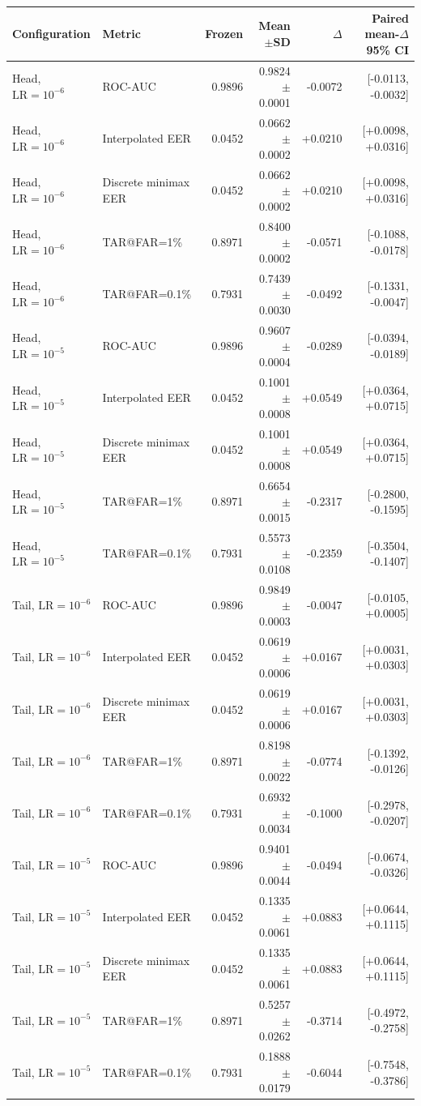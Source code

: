 \begin{tabular}{llrrrr}
\toprule
Configuration & Metric & Frozen & Mean$\pm$SD & $\Delta$ & Paired mean-$\Delta$ 95\% CI \\
\midrule
Head, $\mathrm{LR}=10^{-6}$ & ROC-AUC & 0.9896 & 0.9824$\pm$0.0001 & -0.0072 & [-0.0113, -0.0032] \\
Head, $\mathrm{LR}=10^{-6}$ & Interpolated EER & 0.0452 & 0.0662$\pm$0.0002 & +0.0210 & [+0.0098, +0.0316] \\
Head, $\mathrm{LR}=10^{-6}$ & Discrete minimax EER & 0.0452 & 0.0662$\pm$0.0002 & +0.0210 & [+0.0098, +0.0316] \\
Head, $\mathrm{LR}=10^{-6}$ & TAR@FAR=1\% & 0.8971 & 0.8400$\pm$0.0002 & -0.0571 & [-0.1088, -0.0178] \\
Head, $\mathrm{LR}=10^{-6}$ & TAR@FAR=0.1\% & 0.7931 & 0.7439$\pm$0.0030 & -0.0492 & [-0.1331, -0.0047] \\
Head, $\mathrm{LR}=10^{-5}$ & ROC-AUC & 0.9896 & 0.9607$\pm$0.0004 & -0.0289 & [-0.0394, -0.0189] \\
Head, $\mathrm{LR}=10^{-5}$ & Interpolated EER & 0.0452 & 0.1001$\pm$0.0008 & +0.0549 & [+0.0364, +0.0715] \\
Head, $\mathrm{LR}=10^{-5}$ & Discrete minimax EER & 0.0452 & 0.1001$\pm$0.0008 & +0.0549 & [+0.0364, +0.0715] \\
Head, $\mathrm{LR}=10^{-5}$ & TAR@FAR=1\% & 0.8971 & 0.6654$\pm$0.0015 & -0.2317 & [-0.2800, -0.1595] \\
Head, $\mathrm{LR}=10^{-5}$ & TAR@FAR=0.1\% & 0.7931 & 0.5573$\pm$0.0108 & -0.2359 & [-0.3504, -0.1407] \\
Tail, $\mathrm{LR}=10^{-6}$ & ROC-AUC & 0.9896 & 0.9849$\pm$0.0003 & -0.0047 & [-0.0105, +0.0005] \\
Tail, $\mathrm{LR}=10^{-6}$ & Interpolated EER & 0.0452 & 0.0619$\pm$0.0006 & +0.0167 & [+0.0031, +0.0303] \\
Tail, $\mathrm{LR}=10^{-6}$ & Discrete minimax EER & 0.0452 & 0.0619$\pm$0.0006 & +0.0167 & [+0.0031, +0.0303] \\
Tail, $\mathrm{LR}=10^{-6}$ & TAR@FAR=1\% & 0.8971 & 0.8198$\pm$0.0022 & -0.0774 & [-0.1392, -0.0126] \\
Tail, $\mathrm{LR}=10^{-6}$ & TAR@FAR=0.1\% & 0.7931 & 0.6932$\pm$0.0034 & -0.1000 & [-0.2978, -0.0207] \\
Tail, $\mathrm{LR}=10^{-5}$ & ROC-AUC & 0.9896 & 0.9401$\pm$0.0044 & -0.0494 & [-0.0674, -0.0326] \\
Tail, $\mathrm{LR}=10^{-5}$ & Interpolated EER & 0.0452 & 0.1335$\pm$0.0061 & +0.0883 & [+0.0644, +0.1115] \\
Tail, $\mathrm{LR}=10^{-5}$ & Discrete minimax EER & 0.0452 & 0.1335$\pm$0.0061 & +0.0883 & [+0.0644, +0.1115] \\
Tail, $\mathrm{LR}=10^{-5}$ & TAR@FAR=1\% & 0.8971 & 0.5257$\pm$0.0262 & -0.3714 & [-0.4972, -0.2758] \\
Tail, $\mathrm{LR}=10^{-5}$ & TAR@FAR=0.1\% & 0.7931 & 0.1888$\pm$0.0179 & -0.6044 & [-0.7548, -0.3786] \\
\bottomrule
\end{tabular}
